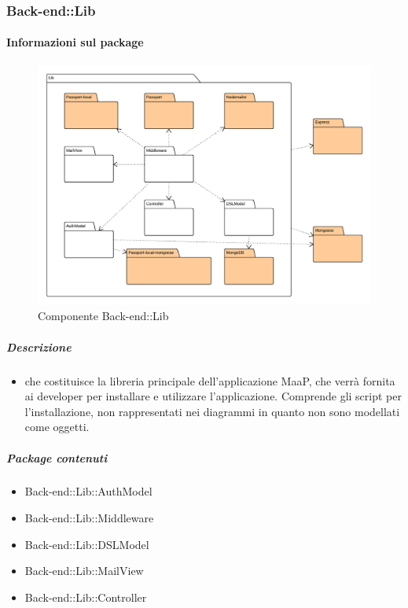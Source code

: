   \subsubsection{Back-end::Lib}
  \paragraph{Informazioni sul package} 
    \begin{figure}[H] 
      \begin{center} 
        \includegraphics[width=\textwidth]{packages/Back-end::Lib.png}  
        \caption{Componente Back-end::Lib}
      \end{center}  
    \end{figure} 
  \subparagraph{Descrizione} 
    \begin{itemize}
    \item[]  che costituisce la libreria principale dell'applicazione MaaP, che verrà fornita ai developer per installare e utilizzare l'applicazione. Comprende gli script per l'installazione, non rappresentati nei diagrammi in quanto non sono modellati come oggetti.
    \end{itemize} 
    \subparagraph{Package contenuti} 
    \begin{itemize}
        \item Back-end::Lib::AuthModel
        \item Back-end::Lib::Middleware
        \item Back-end::Lib::DSLModel
        \item Back-end::Lib::MailView
        \item Back-end::Lib::Controller
    \end{itemize}
